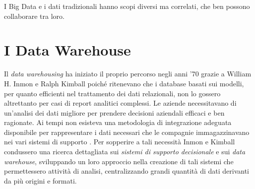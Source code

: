 I Big Data e i dati tradizionali hanno scopi diversi ma correlati, che ben possono collaborare tra loro.

\section{I Data Warehouse}

Il \textit{data warehousing} ha iniziato il proprio percorso negli anni '70 grazie a William H. Inmon e Ralph Kimball poiché ritenevano che i database basati sui modelli, per quanto efficienti nel trattamento dei dati relazionali, non lo gossero altrettanto per casi di report analitici complessi. Le aziende necessitavano di un'analisi dei dati migliore per prendere decisioni aziendali efficaci e ben ragionate. Ai tempi non esisteva una metodologia di integrazione adeguata disponibile per rappresentare i dati necessari che le compagnie immagazzinavano nei vari sistemi di supporto \cite{researchgate_data_warehouse}.
Per sopperire a tali necessità Inmon e Kimball condussero una ricerca dettagliata sui \textit{sistemi di supporto decisionale} e sui \textit{data warehouse}, sviluppando un loro approccio nella creazione di tali sistemi che permettessero attività di analisi, centralizzando grandi quantità di dati derivanti da più origini e formati.

